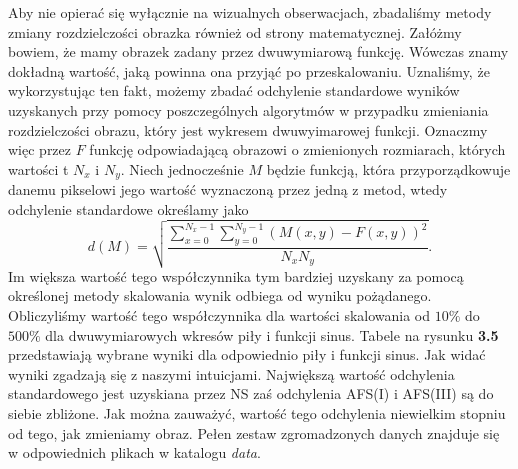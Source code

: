 Aby nie opierać się wyłącznie na wizualnych obserwacjach, zbadaliśmy
metody zmiany rozdzielczości obrazka również od strony matematycznej. Załóżmy
bowiem, że mamy obrazek zadany przez dwuwymiarową funkcję. Wówczas znamy
dokładną wartość, jaką powinna ona przyjąć po przeskalowaniu. Uznaliśmy, że
wykorzystując ten fakt, możemy zbadać odchylenie standardowe wyników uzyskanych przy pomocy
poszczególnych algorytmów w przypadku zmieniania rozdzielczości obrazu, który jest
wykresem dwuwyimarowej funkcji. Oznaczmy więc przez $F$ funkcję odpowiadającą
obrazowi o zmienionych rozmiarach, których wartości t $N_x$ i $N_y$. Niech
jednocześnie $M$ będzie funkcją, która przyporządkowuje danemu pikselowi jego
wartość wyznaczoną przez jedną z metod, wtedy odchylenie standardowe określamy
jako
$$d(M)=\sqrt{\frac{\sum_{x=0}^{N_x-1}{\sum_{y=0}^{N_y-1}{(M(x,y)-F(x,y))^2}}}{N_xN_y}}.$$
Im większa wartość tego współczynnika tym bardziej uzyskany za pomocą określonej
metody skalowania wynik odbiega od wyniku pożądanego. Obliczyliśmy wartość tego
współczynnika dla wartości skalowania od $10\%$ do $500\%$ dla dwuwymiarowych
wkresów piły i funkcji sinus. Tabele na rysunku \textbf{3.5}
przedstawiają wybrane wyniki dla odpowiednio piły i funkcji sinus.
Jak widać wyniki zgadzają się z naszymi intuicjami. Największą wartość odchylenia
standardowego jest uzyskiana przez NS zaś odchylenia AFS(I) i AFS(III) są do siebie zbliżone. Jak można
zauważyć, wartość tego odchylenia niewielkim stopniu od tego, jak zmieniamy obraz.
Pełen zestaw zgromadzonych danych znajduje się w odpowiednich plikach w katalogu
\textit{data}.
